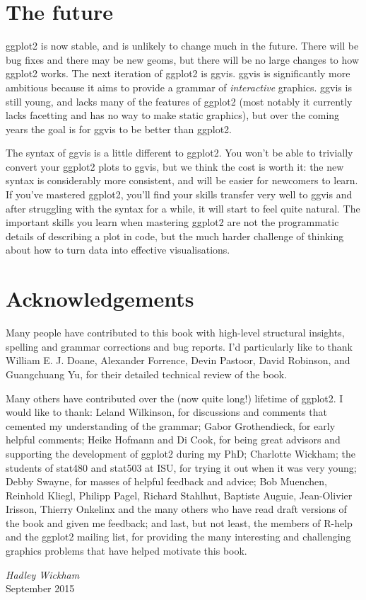 \section*{The future}

ggplot2 is now stable, and is unlikely to change much in the future.
There will be bug fixes and there may be new geoms, but there will be no
large changes to how ggplot2 works. The next iteration of ggplot2 is
ggvis. ggvis is significantly more ambitious because it aims to provide
a grammar of \emph{interactive} graphics. ggvis is still young, and
lacks many of the features of ggplot2 (most notably it currently lacks
facetting and has no way to make static graphics), but over the coming
years the goal is for ggvis to be better than ggplot2.

The syntax of ggvis is a little different to ggplot2. You won't be able
to trivially convert your ggplot2 plots to ggvis, but we think the cost
is worth it: the new syntax is considerably more consistent, and will be
easier for newcomers to learn. If you've mastered ggplot2, you'll find
your skills transfer very well to ggvis and after struggling with the
syntax for a while, it will start to feel quite natural. The important
skills you learn when mastering ggplot2 are not the programmatic details
of describing a plot in code, but the much harder challenge of thinking
about how to turn data into effective visualisations.

\section*{Acknowledgements}

Many people have contributed to this book with high-level structural
insights, spelling and grammar corrections and bug reports. I'd
particularly like to thank William E. J. Doane, Alexander Forrence,
Devin Pastoor, David Robinson, and Guangchuang Yu, for their detailed
technical review of the book.

Many others have contributed over the (now quite long!) lifetime of
ggplot2. I would like to thank: Leland Wilkinson, for discussions and
comments that cemented my understanding of the grammar; Gabor
Grothendieck, for early helpful comments; Heike Hofmann and Di Cook, for
being great advisors and supporting the development of ggplot2 during my
PhD; Charlotte Wickham; the students of stat480 and stat503 at ISU, for
trying it out when it was very young; Debby Swayne, for masses of
helpful feedback and advice; Bob Muenchen, Reinhold Kliegl, Philipp
Pagel, Richard Stahlhut, Baptiste Auguie, Jean-Olivier Irisson, Thierry
Onkelinx and the many others who have read draft versions of the book
and given me feedback; and last, but not least, the members of R-help
and the ggplot2 mailing list, for providing the many interesting and
challenging graphics problems that have helped motivate this book.

\vspace{\baselineskip}\begin{flushright}\noindent
{\it Hadley Wickham}\\
September 2015\\
\end{flushright}
